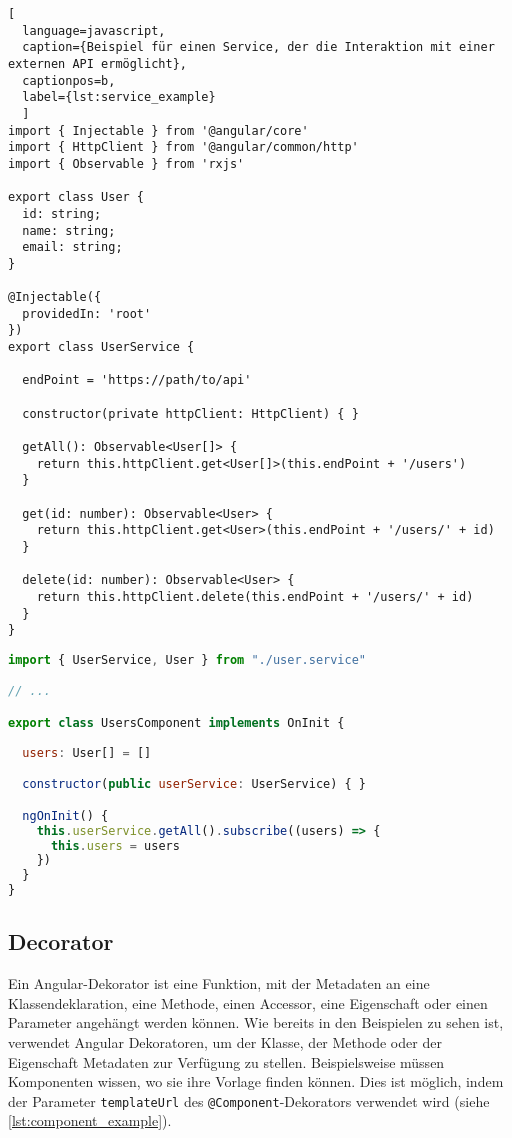 \begin{lstlisting}[
  language=javascript,
  caption={Beispiel für einen Service, der die Interaktion mit einer externen API ermöglicht},
  captionpos=b,
  label={lst:service_example}
  ]
import { Injectable } from '@angular/core'
import { HttpClient } from '@angular/common/http'
import { Observable } from 'rxjs'

export class User {
  id: string;
  name: string;
  email: string;
}

@Injectable({
  providedIn: 'root'
})
export class UserService {

  endPoint = 'https://path/to/api'

  constructor(private httpClient: HttpClient) { }

  getAll(): Observable<User[]> {
    return this.httpClient.get<User[]>(this.endPoint + '/users')
  }

  get(id: number): Observable<User> {
    return this.httpClient.get<User>(this.endPoint + '/users/' + id)
  }  

  delete(id: number): Observable<User> {
    return this.httpClient.delete(this.endPoint + '/users/' + id)
  }
}
\end{lstlisting}

\begin{lstlisting}[language=javascript,caption={Vereinfachtes Beispiel für die Nutzung des Service definiert in \ref{lst:service_example}},captionpos=b]
import { UserService, User } from "./user.service"

// ...

export class UsersComponent implements OnInit {
  
  users: User[] = []

  constructor(public userService: UserService) { }

  ngOnInit() {
    this.userService.getAll().subscribe((users) => {
      this.users = users
    })    
  }  
}
\end{lstlisting}

\subsection{Decorator}

Ein Angular-Dekorator ist eine Funktion, mit der Metadaten an eine Klassendeklaration, eine Methode, einen Accessor, eine Eigenschaft oder einen Parameter angehängt werden können.
Wie bereits in den Beispielen zu sehen ist, verwendet Angular Dekoratoren, um der Klasse, der Methode oder der Eigenschaft Metadaten zur Verfügung zu stellen.
Beispielsweise müssen Komponenten wissen, wo sie ihre Vorlage finden können. Dies ist möglich, indem der Parameter \lstinline{templateUrl} des \lstinline{@Component}-Dekorators verwendet wird (siehe \ref{lst:component_example}).

